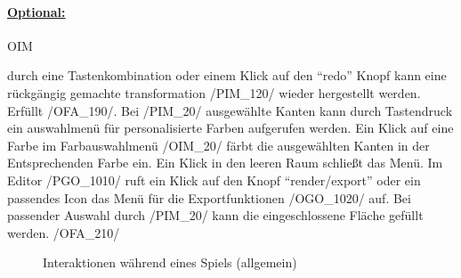 %


\paragraph*{\underline{Optional:}}

\begin{ids}{\gls{OIM}}

	\id[10] durch eine Tastenkombination oder einem Klick auf den "`redo"' Knopf kann eine rückgängig gemachte transformation /PIM\_120/ wieder hergestellt werden. Erfüllt /OFA\_190/.
	\id[20] Bei /PIM\_20/ ausgewählte Kanten kann durch Tastendruck ein auswahlmenü für personalisierte Farben aufgerufen werden.
	\id[30] Ein Klick auf eine Farbe im Farbauswahlmenü /OIM\_20/ färbt die ausgewählten Kanten in der Entsprechenden Farbe ein. Ein Klick in den leeren Raum schließt das Menü.
	\id[40] Im Editor /PGO\_1010/ ruft ein Klick auf den Knopf "`render/export"' oder ein passendes Icon das Menü für die Exportfunktionen /OGO\_1020/ auf.
	\id[50] Bei passender Auswahl durch /PIM\_20/ kann die eingeschlossene Fläche gefüllt werden. /OFA\_210/ 

\end{ids}



\begin{landscape}

	\begin{figure}[ht]
	  \centering
	  
	  \caption{Interaktionen während eines Spiels (allgemein)}
	\end{figure}

\end{landscape}

\clearpage
